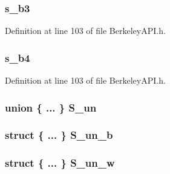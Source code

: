 \subsubsection[{s\+\_\+b3}]{ s\+\_\+b3}\label{structin__addr_af872852810d110496eeac3ca566bc153}


Definition at line 103 of file Berkeley\+A\+P\+I.\+h.

\hypertarget{structin__addr_a864b1f42bfb2d68d244de10e8fd311bb}{}
\subsubsection[{s\+\_\+b4}]{ s\+\_\+b4}\label{structin__addr_a864b1f42bfb2d68d244de10e8fd311bb}


Definition at line 103 of file Berkeley\+A\+P\+I.\+h.

\hypertarget{structin__addr_ad42b4ed4012c0cba1e26a85e72e98248}{}
\subsubsection[{S\+\_\+un}]{\setlength{\rightskip}{0pt plus 5cm}union \{ ... \}  S\+\_\+un}\label{structin__addr_ad42b4ed4012c0cba1e26a85e72e98248}
\hypertarget{structin__addr_ae0b2b1e7d716d219e36f174bb1d20dee}{}
\subsubsection[{S\+\_\+un\+\_\+b}]{\setlength{\rightskip}{0pt plus 5cm}struct \{ ... \}   S\+\_\+un\+\_\+b}\label{structin__addr_ae0b2b1e7d716d219e36f174bb1d20dee}
\hypertarget{structin__addr_ade4ac89fd59c298981569985861345a2}{}
\subsubsection[{S\+\_\+un\+\_\+w}]{\setlength{\rightskip}{0pt plus 5cm}struct \{ ... \}   S\+\_\+un\+\_\+w}\label{structin__addr_ade4ac89fd59c298981569985861345a2}
\hypertarget{structin__addr_a98e4022e8f9139a753a5a4756a356080}{}
